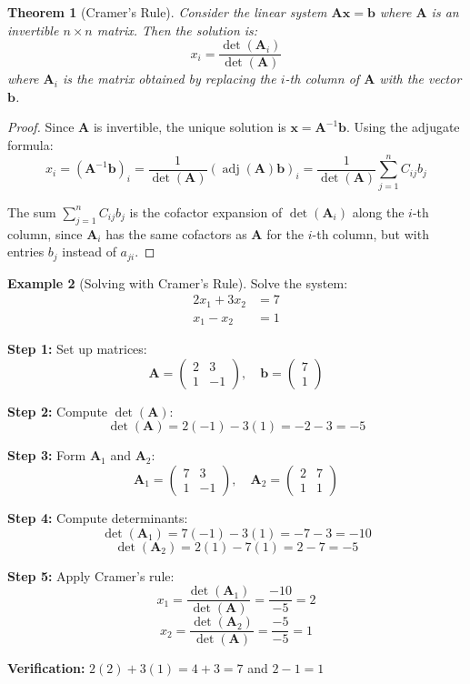 \documentclass[12pt]{article}
\numberwithin{equation}{section}
\newcommand{\vect}[1]{\boldsymbol{#1}}   %
\newcommand{\mat}[1]{\mathbf{#1}}        %
\newcommand{\adj}{\operatorname{adj}}
\theoremstyle{plain}
\newtheorem{theorem}{Theorem}[section]
\theoremstyle{definition}
\newtheorem{example}[theorem]{Example}
\theoremstyle{remark}
\begin{document}
\begin{theorem}[Cramer's Rule]
Consider the linear system $\mat{A}\vect{x} = \vect{b}$ where $\mat{A}$ is an invertible $n \times n$ matrix. Then the solution is:
$$x_i = \frac{\det(\mat{A}_i)}{\det(\mat{A})}$$
where $\mat{A}_i$ is the matrix obtained by replacing the $i$-th column of $\mat{A}$ with the vector $\vect{b}$.
\end{theorem}

\begin{proof}
Since $\mat{A}$ is invertible, the unique solution is $\vect{x} = \mat{A}^{-1}\vect{b}$. Using the adjugate formula:
$$x_i = (\mat{A}^{-1}\vect{b})_i = \frac{1}{\det(\mat{A})}(\adj(\mat{A})\vect{b})_i = \frac{1}{\det(\mat{A})}\sum_{j=1}^n C_{ij}b_j$$

The sum $\sum_{j=1}^n C_{ij}b_j$ is the cofactor expansion of $\det(\mat{A}_i)$ along the $i$-th column, since $\mat{A}_i$ has the same cofactors as $\mat{A}$ for the $i$-th column, but with entries $b_j$ instead of $a_{ji}$.
\end{proof}

\begin{example}[Solving with Cramer's Rule]
Solve the system:
\begin{align}
2x_1 + 3x_2 &= 7\\
x_1 - x_2 &= 1
\end{align}

\textbf{Step 1:} Set up matrices:
$$\mat{A} = \begin{pmatrix} 2 & 3 \\ 1 & -1 \end{pmatrix}, \quad \vect{b} = \begin{pmatrix} 7 \\ 1 \end{pmatrix}$$

\textbf{Step 2:} Compute $\det(\mat{A})$:
$$\det(\mat{A}) = 2(-1) - 3(1) = -2 - 3 = -5$$

\textbf{Step 3:} Form $\mat{A}_1$ and $\mat{A}_2$:
$$\mat{A}_1 = \begin{pmatrix} 7 & 3 \\ 1 & -1 \end{pmatrix}, \quad \mat{A}_2 = \begin{pmatrix} 2 & 7 \\ 1 & 1 \end{pmatrix}$$

\textbf{Step 4:} Compute determinants:
$$\det(\mat{A}_1) = 7(-1) - 3(1) = -7 - 3 = -10$$
$$\det(\mat{A}_2) = 2(1) - 7(1) = 2 - 7 = -5$$

\textbf{Step 5:} Apply Cramer's rule:
$$x_1 = \frac{\det(\mat{A}_1)}{\det(\mat{A})} = \frac{-10}{-5} = 2$$
$$x_2 = \frac{\det(\mat{A}_2)}{\det(\mat{A})} = \frac{-5}{-5} = 1$$

\textbf{Verification:} $2(2) + 3(1) = 4 + 3 = 7$ \checkmark and $2 - 1 = 1$ \checkmark
\end{example}
\end{document}
